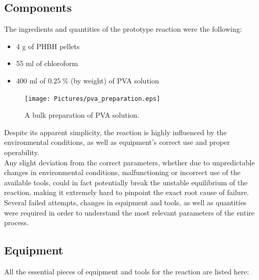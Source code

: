\documentclass{article}
\begin{document}
        \subsection{Components\label{Components}}

        The ingredients and quantities of the prototype reaction were the following: 

            \begin{itemize}
                \item 4 g of PHBH pellets 
                \item 55 ml of chloroform 
                \item 400 ml of $0.25 \ \% $ (by weight) of PVA solution 
            \end{itemize} 
        
        \clearpage

            \begin{figure}[h!]
                \centering
                \texttt{[image: Pictures/pva\_preparation.eps]}
                \caption{A bulk preparation of PVA solution.}
                \label{fig:PVA}
            \end{figure}

        Despite its apparent simplicity, the reaction is highly influenced by the environmental conditions, as well as
        equipment's correct use and proper operability. \\ 
        
        Any slight deviation from the correct parameters, whether due to 
        unpredictable changes in environmental conditions, malfunctioning or incorrect use of the available tools, could 
        in fact potentially break the unstable equilibrium of the reaction, making it extremely 
        hard to pinpoint the exact root cause of failure. \\  

        Several failed attempts, changes in equipment and tools, as well as quantities were required in order 
        to understand the most relevant parameters of the entire process. 
        \subsection{Equipment\label{Equipment}}

        All the essential pieces of equipment and tools for the reaction are listed here: 
\end{document}
